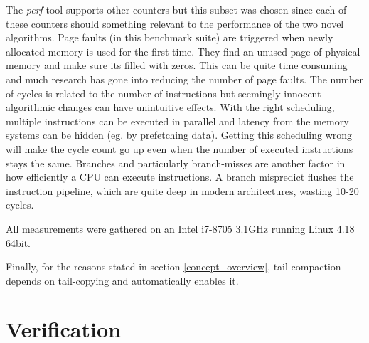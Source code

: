 \documentclass[a4paper,oneside]{memoir}
\begin{document}
The \emph{perf} tool supports other counters but this subset was chosen since
each of these counters should something relevant to the performance of the two
novel algorithms. Page faults (in this benchmark suite) are triggered when newly
allocated memory is used for the first time. They find an unused page of physical
memory and make sure its filled with zeros. This can be quite time consuming
and much research has gone into reducing the number of page faults.\cite{Nakashima:1995,Chase:1987,Moon:1984,Grunwald:1993}
The number of cycles is related to the number of instructions but seemingly
innocent algorithmic changes can have unintuitive effects. With the right
scheduling, multiple instructions can be executed in parallel and latency from
the memory systems can be hidden (eg. by prefetching data). Getting this scheduling
wrong will make the cycle count go up even when the number of executed instructions
stays the same. Branches and particularly branch-misses are another factor in
how efficiently a CPU can execute instructions. A branch mispredict flushes the
instruction pipeline, which are quite deep in modern architectures, wasting
10-20 cycles.\cite{Drepper}

All measurements were gathered on an Intel i7-8705 3.1GHz running Linux 4.18 64bit.

Finally, for the reasons stated in section \ref{concept_overview}, tail-compaction
depends on tail-copying and automatically enables it.

\section{Verification}
\end{document}
